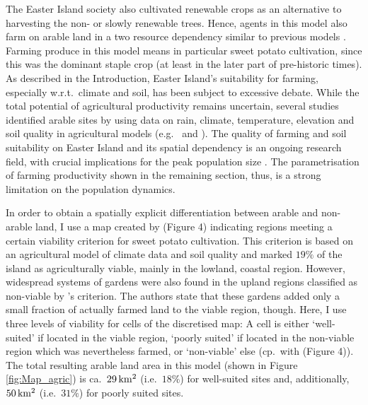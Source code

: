 The Easter Island society also cultivated renewable crops as an alternative to harvesting the non- or slowly renewable trees.
Hence, agents in this model also farm on arable land in a two resource dependency similar to previous models \citep{dAlessandro2007}.
Farming produce in this model means in particular sweet potato cultivation, since this was the dominant staple crop \citep{Louwagie2006} (at least in the later part of pre-historic times).
As described in the Introduction, Easter Island's suitability for farming, especially w.r.t.\ climate and soil, has been subject to excessive debate.
While the total potential of agricultural productivity remains uncertain, several studies identified arable sites by using data on rain, climate, temperature, elevation and soil quality in agricultural models (e.g.\ \citet{Louwagie2006} and \citet{Puleston2017}).
The quality of farming and soil suitability on Easter Island and its spatial dependency is an ongoing research field, with crucial implications for the peak population size \citep{Puleston2017}.
The parametrisation of farming productivity shown in the remaining section, thus, is a strong limitation on the population dynamics.

In order to obtain a spatially explicit differentiation between arable and non-arable land, I use a map created by \citet{Puleston2017} (Figure 4) indicating regions meeting a certain viability criterion for sweet potato cultivation.
This criterion is based on an agricultural model of climate data and soil quality and marked $19\%$ of the island as agriculturally viable, mainly in the lowland, coastal region.
However, widespread systems of gardens were also found in the upland regions classified as non-viable by \citet{Puleston2017}'s criterion.
The authors state that these gardens added only a small fraction of actually farmed land to the viable region, though.
Here, I use three levels of viability for cells of the discretised map: 
A cell is either `well-suited' if located in the viable region, `poorly suited' if located in the non-viable region which was nevertheless farmed, or `non-viable' else (cp.\ with \citet{Puleston2017} (Figure 4)).
The total resulting arable land area in this model (shown in Figure \ref{fig:Map_agric}) is ca.\ $29\,  {\rm km^2}$ (i.e.\ $18\%$) for well-suited sites and, additionally, $50\, {\rm km^2}$ (i.e.\ $31\%$) for poorly suited sites.

